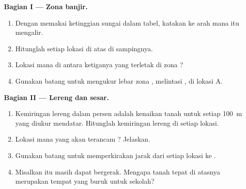 \begin{problem}
\noindent\textbf{Bagian I --- Zona banjir.}\par\nopagebreak
\begin{enumerate}[beginpenalty=10000]
  \item Dengan memakai ketinggian sungai dalam tabel, katakan ke arah mana
         itu mengalir.
  \item Hitunglah  setiap lokasi di atas  di sampingnya.
  \item Lokasi mana di antara ketiganya yang terletak di zona ?
  \item Gunakan batang  untuk mengukur lebar zona , melintasi
        , di lokasi A.
\end{enumerate}

\noindent\textbf{Bagian II --- Lereng dan sesar.}\par\nopagebreak
\begin{enumerate}[resume, beginpenalty=10000]
  \item Kemiringan lereng dalam persen adalah kenaikan tanah untuk setiap
        \qty{100}{m} yang diukur mendatar. Hitunglah kemiringan lereng di
        setiap lokasi.
  \item Lokasi mana yang akan terancam ? Jelaskan.
  \item Gunakan batang  untuk memperkirakan jarak dari setiap lokasi
        ke .
  \item Misalkan  itu masih dapat bergerak. Mengapa tanah tepat di
        atasnya merupakan tempat yang buruk untuk sekolah?
\end{enumerate}


\end{problem}
